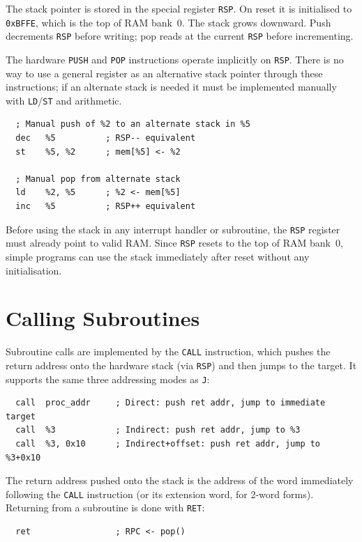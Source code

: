 \documentclass[a4paper,12pt]{report}
\newcommand{\asm}[1]{\texttt{#1}}
\begin{document}
The stack pointer is stored in the special register \asm{RSP}. On reset it is initialised to \texttt{0xBFFE}, which is the top of RAM bank~0. The stack grows downward. Push decrements \asm{RSP} before writing; pop reads at the current \asm{RSP} before incrementing.

The hardware \asm{PUSH} and \asm{POP} instructions operate implicitly on \asm{RSP}. There is no way to use a general register as an alternative stack pointer through these instructions; if an alternate stack is needed it must be implemented manually with \asm{LD}/\asm{ST} and arithmetic.

\begin{lstlisting}
  ; Manual push of %2 to an alternate stack in %5
  dec   %5          ; RSP-- equivalent
  st    %5, %2      ; mem[%5] <- %2

  ; Manual pop from alternate stack
  ld    %2, %5      ; %2 <- mem[%5]
  inc   %5          ; RSP++ equivalent
\end{lstlisting}

Before using the stack in any interrupt handler or subroutine, the \asm{RSP} register must already point to valid RAM. Since \asm{RSP} resets to the top of RAM bank~0, simple programs can use the stack immediately after reset without any initialisation.

\section{Calling Subroutines}
\label{sec:callingsubroutines}

Subroutine calls are implemented by the \asm{CALL} instruction, which pushes the return address onto the hardware stack (via \asm{RSP}) and then jumps to the target. It supports the same three addressing modes as \asm{J}:

\begin{lstlisting}
  call  proc_addr     ; Direct: push ret addr, jump to immediate target
  call  %3            ; Indirect: push ret addr, jump to %3
  call  %3, 0x10      ; Indirect+offset: push ret addr, jump to %3+0x10
\end{lstlisting}

The return address pushed onto the stack is the address of the word immediately following the \asm{CALL} instruction (or its extension word, for 2-word forms). Returning from a subroutine is done with \asm{RET}:

\begin{lstlisting}
  ret                 ; RPC <- pop()
\end{lstlisting}
\end{document}
